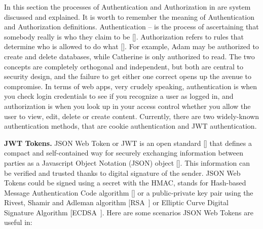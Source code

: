 In this section the processes of Authentication and Authorization in are system discussed and explained.
It is worth to remember the meaning of Authentication and Authorization definitions.
Authentication -- is the process of ascertaining that somebody really is who they claim to be [\cite{burrows1989logic}].
Authorization refers to rules that determine who is allowed to do what [\cite{fagin1978authorization}].
For example, Adam may be authorized to create and delete databases, while Catherine is only authorized to read.
The two concepts are completely orthogonal and independent, but both are central to security design, and the
failure to get either one correct opens up the avenue to compromise.
In terms of web apps, very crudely speaking, authentication is when you check login credentials to see if you recognize
a user as logged in, and authorization is when you look up in your access control whether you allow the user to view,
edit, delete or create content.
Currently, there are two widely-known authentication methods, that are cookie authentication and JWT authentication.

\textbf{JWT Tokens.}
JSON Web Token or JWT is an open standard [\cite{jones2015rfc}] that defines a compact and self-contained way for securely
exchanging information between parties as a Javascript Object Notation (JSON) object [\cite{jones2015json}].
This information can be verified and trusted thanks to digital signature of the sender.
JSON Web Tokens could be signed using a secret with the HMAC,
stands for Hash-based Message Authentication Code algorithm [\cite{wang2004hmac}] or a public-private key pair using
the Rivest, Shamir and Adleman algorithm [RSA~\cite{wiener1990cryptanalysis}] or Elliptic Curve Digital Signature Algorithm
[ECDSA~\cite{johnson2001elliptic}].
Here are some scenarios JSON Web Tokens are useful in:

